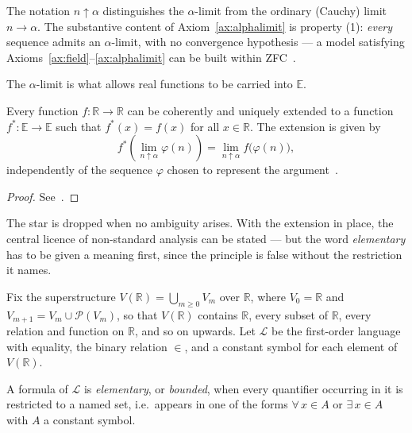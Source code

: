 The notation $n \uparrow \alpha$ distinguishes the $\alpha$-limit from the ordinary
(Cauchy) limit $n \to \alpha$. The substantive content of
Axiom~\ref{ax:alphalimit} is property (1): \emph{every} sequence admits an
$\alpha$-limit, with no convergence hypothesis --- a model satisfying
Axioms~\ref{ax:field}--\ref{ax:alphalimit} can be built within
ZFC~\cite{benci2019measure,benci2022nonstandard}.

The $\alpha$-limit is what allows real functions to be carried into $\mathbb{E}$.

\begin{theorem}
\label{thm:star-extension}
Every function $f:\mathbb{R}\to\mathbb{R}$ can be coherently and uniquely extended to
a function $f^{*}:\mathbb{E}\to\mathbb{E}$ such that $f^{*}(x) = f(x)$ for all
$x \in \mathbb{R}$. The extension is given by
\begin{equation}
  \label{eq:star-extension}
  f^{*}\!\left(\lim_{n \uparrow \alpha} \varphi(n)\right)
  = \lim_{n \uparrow \alpha} f\big(\varphi(n)\big),
\end{equation}
independently of the sequence $\varphi$ chosen to represent the
argument~\cite{fiaschi2024informed,benci2022nonstandard}.
\end{theorem}

\begin{proof}
See~\cite{benci2019measure,benci2022nonstandard}.
\end{proof}

The star is dropped when no ambiguity arises. With the extension in place, the
central licence of non-standard analysis can be stated --- but the word
\emph{elementary} has to be given a meaning first, since the principle is false
without the restriction it names.

Fix the superstructure $V(\mathbb{R}) = \bigcup_{m \ge 0} V_m$ over $\mathbb{R}$,
where $V_0 = \mathbb{R}$ and $V_{m+1} = V_m \cup \mathcal{P}(V_m)$, so that
$V(\mathbb{R})$ contains $\mathbb{R}$, every subset of $\mathbb{R}$, every relation
and function on $\mathbb{R}$, and so on upwards. Let $\mathcal{L}$ be the first-order
language with equality, the binary relation $\in$, and a constant symbol for each
element of $V(\mathbb{R})$.

\begin{definition}
\label{def:elementary}
A formula of $\mathcal{L}$ is \emph{elementary}, or \emph{bounded}, when every
quantifier occurring in it is restricted to a named set, i.e.\ appears in one of the
forms $\forall\, x \in A$ or $\exists\, x \in A$ with $A$ a constant symbol.
\end{definition}


